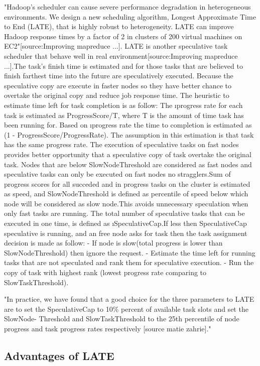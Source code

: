 "Hadoop’s scheduler can cause severe performance degradation in heterogeneous environments. We design a new scheduling algorithm, Longest Approximate Time to End (LATE), that is highly robust to heterogeneity. LATE can improve Hadoop response times by a factor of 2 in clusters of 200 virtual machines on EC2"[source:Improving mapreduce ...].
LATE is another speculative task scheduler that behave well in real environment[source:Improving mapreduce ...].The task's finish time is estimated and for those tasks that are believed to finish farthest time into the future are speculatively executed. Because the speculative copy are execute in faster nodes so they have better chance to overtake the original copy and reduce job response time. 
The heuristic to estimate time left for task completion is as follow: The \i{progress rate} for each task is estimated as  ProgressScore/T, where T is the amount of time task has been running for. Based on \i{progress rate} the time to completion is estimated as (1 - ProgressScore/ProgressRate). The assumption in this estimation is that task has the same progress rate.
The execution of speculative tasks on fast nodes provides better opportunity that a speculative copy of task overtake the original task. Nodes that are below SlowNodeThreshold are considered as fast nodes and speculative tasks can only be executed on fast nodes no stragglers.Sum of progress scores for all succeded and in progress tasks on the cluster is estimated as speed, and SlowNodeThreshold is defined as percentile of speed below which node will be considered as slow node.This avoids unnecessary speculation when only fast tasks are running.  
The total number of speculative tasks that can be executed in one time, is defined as \i{SpeculativeCap}.If less then SpeculativeCap speculative is running, and an free node asks for task then the task assignment decision is made as follow:
 - If node is slow(total progress is lower than SlowNodeThreshold) then ignore the request. 
 - Estimate the time left for running tasks that are not speculated and rank them for speculative execution. 
 - Run the copy of task with highest rank (lowest progress rate comparing to SlowTaskThreshold). 
 
"In practice, we have found that a good choice for the three parameters to LATE are to set the SpeculativeCap to 10\% percent of available task slots and set the SlowNode- Threshold and SlowTaskThreshold to the 25th percentile of node progress and task progress rates respectively [source matie zahrie]."
 
\subsection{Advantages of LATE}

